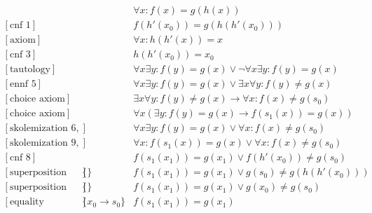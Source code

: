 \documentclass[onehalfspacing]{article}
\theoremstyle{definition}
\theoremstyle{definition}
\theoremstyle{definition}
\theoremstyle{definition}
\theoremstyle{definition}
\theoremstyle{definition}
\begin{document}
\setcounter{equation}{0}
\begin{align}
	[\text{axiom}]&&\forall x: f(x) = g(h(x))\\
	[\text{cnf 1}]&&f(h'(x_0)) = g(h(h'(x_0)))\\
	[\text{axiom}]&&\forall x: h(h'(x)) = x\\
	[\text{cnf 3}]&&h(h'(x_0)) = x_0\\
	[\text{tautology}]&&\forall x\exists y: f(y) = g(x)\vee\neg\forall x\exists y: f(y) = g(x)\\
	[\text{ennf 5}]&&\forall x\exists y: f(y) = g(x)\vee\exists x\forall y: f(y)\neq g(x)\\
	[\text{choice axiom}]&&\exists x\forall y: f(y)\neq g(x)\rightarrow \forall x : f(x) \neq g(s_0)\\
	[\text{choice axiom}]&&\forall x(\exists y: f(y)= g(x)\rightarrow f(s_1(x)) = g(x))\\
	[\text{skolemization 6, 7}]&&\forall x\exists y: f(y) = g(x)\vee\forall x: f(x)\neq g(s_0)\\
	[\text{skolemization 9, 8}]&&\forall x: f(s_1(x)) = g(x)\vee\forall x: f(x)\neq g(s_0)\\
	[\text{cnf 8}]&&f(s_1(x_1)) = g(x_1)\vee f(h'(x_0))\neq g(s_0)\\
	[\text{superposition 11, 2}]&\{\}&f(s_1(x_1)) = g(x_1)\vee g(s_0)\neq g(h(h'(x_0)))\\
	[\text{superposition 12, 4}]&\{\}&f(s_1(x_1)) = g(x_1)\vee g(x_0)\neq g(s_0)\\
	[\text{equality resolution 13}]&\{x_0\to s_0\}&f(s_1(x_1)) = g(x_1)
\end{align}
\end{document}
